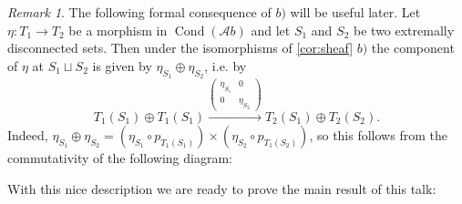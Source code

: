 \documentclass[11pt,A4]{article}
\theoremstyle{plain}
\theoremstyle{definition}
\theoremstyle{remark}
\newtheorem{rem}[thm]{Remark}
\newcommand{\Ab}{\mathscr{A}b}
\DeclareMathOperator{\Cond}{Cond}
\newcommand{\op}{\oplus}
\begin{document}
\begin{rem}\label{rem:sumcomponent}
    The following formal consequence of $b)$ will be useful later.
    Let $\eta\colon T_{1}\to T_{2}$ be a morphism in $\Cond(\Ab)$ and let $S_{1}$ and $S_{2}$ be two extremally disconnected sets.
    Then under the isomorphisms of \cref{cor:sheaf} $b)$ the component of $\eta$ at $S_{1}\sqcup S_{2}$ is given by $\eta_{S_{1}}\op \eta_{S_{2}}$, i.e. by
    \[ T_{1}(S_{1})\op T_{1}(S_{1})\xrightarrow{\begin{pmatrix} \eta_{S_{1}} & 0 \\ 0 & \eta_{S_{2}} \end{pmatrix}} T_{2}(S_{1})\op T_{2}(S_{2}).\]
	Indeed, $\eta_{S_{1}}\op \eta_{S_{2}}=(\eta_{S_{1}}\circ p_{T_{1}(S_{1})})\times (\eta_{S_{2}}\circ p_{T_{1}(S_{2})})$, so this follows from the commutativity of the following diagram:
	\begin{center}
	\end{center}
\end{rem}

With this nice description we are ready to prove the main result of this talk:
\end{document}
